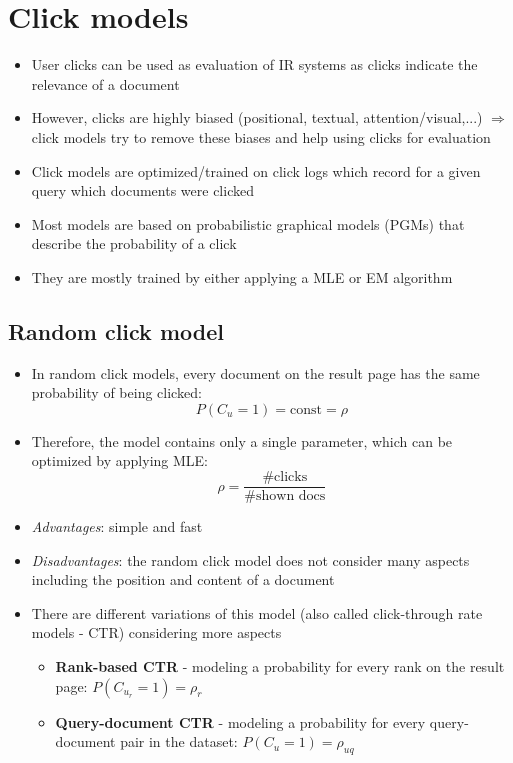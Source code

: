 \section{Click models}
\begin{itemize}
	\item User clicks can be used as evaluation of IR systems as clicks indicate the relevance of a document
	\item However, clicks are highly biased (positional, textual, attention/visual,...) $\Rightarrow$ click models try to remove these biases and help using clicks for evaluation
	\item Click models are optimized/trained on click logs which record for a given query which documents were clicked
	\item Most models are based on probabilistic graphical models (PGMs) that describe the probability of a click
	\item They are mostly trained by either applying a MLE or EM algorithm
\end{itemize}
\subsection{Random click model}
\begin{itemize}
	\item In random click models, every document on the result page has the same probability of being clicked: $$P(C_u = 1) = \text{const} = \rho$$
	\item Therefore, the model contains only a single parameter, which can be optimized by applying MLE: $$\rho = \frac{\#\text{clicks}}{\#\text{shown docs}}$$
	\item \textit{Advantages}: simple and fast
	\item \textit{Disadvantages}: the random click model does not consider many aspects including the position and content of a document
	\item There are different variations of this model (also called click-through rate models - CTR) considering more aspects
	\begin{itemize}
		\item \textbf{Rank-based CTR} - modeling a probability for every rank on the result page: $P(C_{u_r} = 1) = \rho_r$
		\item \textbf{Query-document CTR} - modeling a probability for every query-document pair in the dataset: $P(C_{u}=1) = \rho_{uq}$
	\end{itemize}
\end{itemize}
